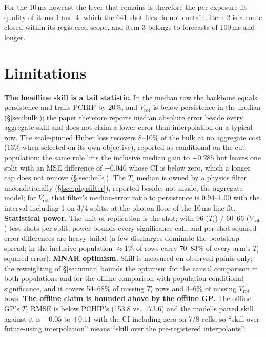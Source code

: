 \documentclass[10pt]{article}
\newcommand{\Ti}{\ensuremath{T_i}}
\newcommand{\Vrot}{\ensuremath{V_\mathrm{rot}}}
\begin{document}
For the 10\,ms nowcast the lever that remains is therefore the per-exposure fit
quality of items 1 and 4, which the 641 shot files do not contain. Item 2 is a
route closed within its registered scope, and item 3 belongs to forecasts of
100\,ms and longer.

\section{Limitations}
\label{sec:limits}

\textbf{The headline skill is a tail statistic.} In the median row the backbone
equals persistence and trails PCHIP by 20\%, and \Vrot{} is below persistence in the
median (\S\ref{sec:bulk}); the paper therefore reports median absolute error beside
every aggregate skill and does not claim a lower error than interpolation on a typical row. The
scale-pinned Huber loss recovers 8--10\% of the bulk at no aggregate cost
(13\% when selected on its own objective), reported as conditional on the cut
population; the same rule lifts the inclusive median gain to $+0.285$ but leaves
one split with an MSE difference of $-0.040$ whose CI is below zero, which a longer cap does not remove
(\S\ref{sec:bulk}). The
\Ti{} median is owned by a physics filter unconditionally (\S\ref{sec:physfilter}),
reported beside, not inside, the aggregate model; for \Vrot{} that filter's median-error
ratio to persistence is 0.94--1.00 with the interval including 1 on 3/4 splits, at the
photon floor of the 10\,ms line fit.
\textbf{Statistical power.} The unit of replication is the shot; with 96 (\Ti) /
60--66 (\Vrot) test shots per split, power bounds every significance call, and
per-shot squared-error differences are heavy-tailed (a few discharges dominate the
bootstrap spread; in the inclusive population $\approx$1\% of rows carry 70--83\%
of every arm's \Ti{} squared error).
\textbf{MNAR optimism.} Skill is measured on observed points only; the reweighting
of \S\ref{sec:mnar} bounds the optimism for the causal comparison in both
populations and for the offline comparison with population-conditional
significance, and it covers 54--68\% of missing \Ti{} rows and 4--6\% of missing
\Vrot{} rows.
\textbf{The offline claim is bounded above by the offline GP.} The offline GP's
\Ti{} RMSE is below PCHIP's (153.8 vs.\ 173.6) and the model's paired skill against
it is $-0.05$ to $+0.11$ with the CI including zero on 7/8 cells, so ``skill over
future-using interpolation'' means ``skill over the pre-registered interpolants'';
\end{document}
